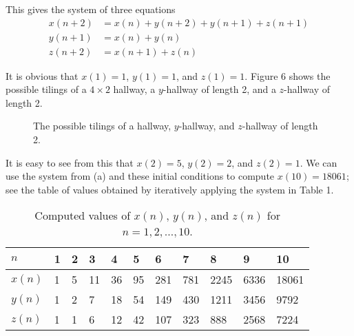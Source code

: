 \documentclass[newpage]{homework}
\begin{document}
\begin{alphaparts}
		This gives the system of three equations
		\begin{equation*}
			\begin{aligned}
				x(n+2) &= x(n) + y(n+2) + y(n+1) + z(n+1) \\
				y(n+1) &= x(n) + y(n) \\
				z(n+2) &= x(n+1) + z(n)
			\end{aligned}
		\end{equation*}
	
		\questionpart It is obvious that $x(1) = 1$, $y(1) = 1$, and $z(1) = 1$. Figure 6 shows the possible tilings of a $4\times 2$ hallway, a $y$-hallway of length 2, and a $z$-hallway of length 2.
		\begin{figure}[H]
			\centering
			
			\caption{The possible tilings of a hallway, $y$-hallway, and $z$-hallway of length 2.}
		\end{figure}
		It is easy to see from this that $x(2) = 5$, $y(2) =2$, and $z(2) =1$. We can use the system from (a) and these initial conditions to compute $x(10)=18061$; see the table of values obtained by iteratively applying the system in Table 1.
		
		\begin{table}[H]
			\centering
			\begin{tabular}{@{}l|llllllllll@{}}
				$n$ & 1 & 2 & 3 & 4 & 5 & 6 & 7 & 8 & 9 & 10 \\
				\midrule
				$x(n)$ & 1 & 5 & 11 & 36 & 95 & 281 & 781 & 2245 & 6336 & 18061  \\
				$y(n)$ & 1 & 2 & 7 & 18 & 54 & 149 & 430 & 1211 & 3456 & 9792  \\
				$z(n)$ & 1 & 1 & 6 & 12 & 42 & 107 & 323 & 888 & 2568 & 7224  \\
			\end{tabular}
			\caption{Computed values of $x(n)$, $y(n)$, and $z(n)$ for $n = 1,2,\dots,10$.}
		\end{table}
		
	\end{alphaparts}
	
\end{document}
